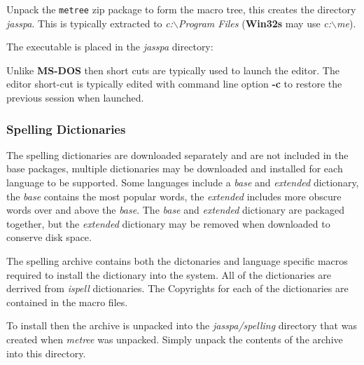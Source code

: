\documentclass[11pt,a4paper,pdftex]{article}
\begin{document}
  Unpack the \texttt{metree} zip package to form the macro tree, this creates
  the directory \textit{jasspa}. This is typically extracted to
  \textit{c:$\backslash$Program Files} (\textbf{Win32s} may use
  \textit{c:$\backslash$me}).


  The executable is placed in the \textit{jasspa} directory:


  Unlike \textbf{MS-DOS} then short cuts are typically used to launch the
  editor. The editor short-cut is typically edited with command line option
  \textbf{-c} to restore the previous session when launched.

\subsubsection{Spelling Dictionaries}

  The spelling dictionaries are downloaded separately and are not included in
  the base packages, multiple dictionaries may be downloaded and installed for
  each language to be supported. Some languages include a \textit{base} and
  \textit{extended} dictionary, the \textit{base} contains the most popular
  words, the \textit{extended} includes more obscure words over and above the
  \textit{base}. The \textit{base} and \textit{extended} dictionary are
  packaged together, but the \textit{extended} dictionary may be removed when
  downloaded to conserve disk space.

  The spelling archive contains both the dictonaries and language specific
  macros required to install the dictionary into the system. All of the
  dictionaries are derrived from \textit{ispell} dictionaries. The Copyrights
  for each of the dictionaries are contained in the macro files.

  To install then the archive is unpacked into the \textit{jasspa/spelling}
  directory that was created when \textit{metree} was unpacked. Simply unpack
  the contents of the archive into this directory.

\end{document}
